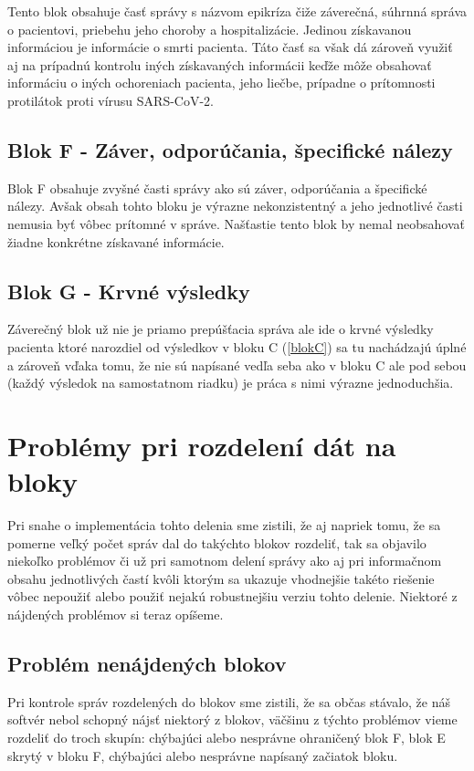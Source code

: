Tento blok obsahuje časť správy s názvom epikríza čiže záverečná, súhrnná správa o pacientovi, priebehu jeho choroby a hospitalizácie. Jedinou získavanou informáciou je informácie o smrti pacienta. Táto časť sa však dá zároveň využiť aj na prípadnú kontrolu iných získavaných informácii keďže môže obsahovať informáciu o iných ochoreniach pacienta, jeho liečbe, prípadne o prítomnosti protilátok proti vírusu SARS-CoV-2.

\subsection{Blok F - Záver, odporúčania, špecifické nálezy}

Blok F obsahuje zvyšné časti správy ako sú záver, odporúčania a špecifické nálezy. Avšak obsah tohto bloku je výrazne nekonzistentný a jeho jednotlivé časti nemusia byť vôbec prítomné v správe. Našťastie tento blok by nemal neobsahovať žiadne konkrétne získavané informácie.

\subsection{Blok G - Krvné výsledky}
\label{blokG}
Záverečný blok už nie je priamo prepúšťacia správa ale ide o krvné výsledky pacienta ktoré narozdiel od výsledkov v bloku C (\ref{blokC}) sa tu nachádzajú úplné a zároveň vďaka tomu, že nie sú napísané vedľa seba ako v bloku C ale pod sebou (každý výsledok na samostatnom riadku) je práca s nimi výrazne jednoduchšia.

\section{Problémy pri rozdelení dát na bloky} 

Pri snahe o implementácia tohto delenia sme zistili, že aj napriek tomu, že sa pomerne veľký počet správ dal do takýchto blokov rozdeliť, tak sa objavilo niekoľko problémov či už pri samotnom delení správy ako aj pri informačnom obsahu jednotlivých častí kvôli ktorým sa ukazuje vhodnejšie takéto riešenie vôbec nepoužiť alebo použiť nejakú robustnejšiu verziu tohto delenie. Niektoré z nájdených problémov si teraz opíšeme.

\subsection{Problém nenájdených blokov}

Pri kontrole správ rozdelených do blokov sme zistili, že sa občas stávalo, že náš softvér nebol schopný nájsť niektorý z blokov, väčšinu z týchto problémov vieme rozdeliť do troch skupín: chýbajúci alebo nesprávne ohraničený blok F, blok E skrytý v bloku F, chýbajúci alebo nesprávne napísaný začiatok bloku.

